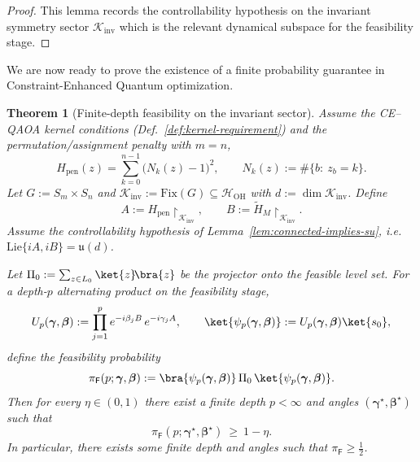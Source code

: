\documentclass[a4paper,unpublished,onecolumn,11pt]{quantumarticle}
\newtheorem{theorem}{Theorem}
\theoremstyle{definition}
\theoremstyle{remark}
\newcommand{\OH}{\mathcal{H}_{\mathrm{OH}}}
\begin{document}
\begin{proof}
This lemma records the controllability hypothesis on the invariant symmetry sector
$\mathcal K_{\mathrm{inv}}$ which is the relevant dynamical subspace for the feasibility stage.
\end{proof}

\medskip
We are now ready to prove the existence of a finite probability guarantee in Constraint-Enhanced Quantum optimization.

\begin{theorem}[Finite-depth feasibility on the invariant sector]
\label{thm:finite-depth-feasible}
Assume the CE--QAOA kernel conditions (Def.~\ref{def:kernel-requirement}) and the
permutation/assignment penalty with $m=n$,
\[
H_{\mathrm{pen}}(z)=\sum_{k=0}^{n-1}\bigl(N_k(z)-1\bigr)^2,
\qquad N_k(z):=\#\{b:\ z_b=k\}.
\]
Let $G:=S_m\times S_n$ and $\mathcal K_{\mathrm{inv}}:=\mathrm{Fix}(G)\subseteq\OH$ with $d:=\dim\mathcal K_{\mathrm{inv}}$.
Define
\[
A:=H_{\mathrm{pen}}\!\upharpoonright_{\mathcal K_{\mathrm{inv}}},
\qquad
B:=\widetilde H_M\!\upharpoonright_{\mathcal K_{\mathrm{inv}}}.
\]
Assume the controllability hypothesis of Lemma~\ref{lem:connected-implies-su}, i.e.\
$\mathrm{Lie}\{iA,iB\}=\mathfrak u(d)$.

Let $\Pi_0:=\sum_{z\in L_0}\ket{z}\!\bra{z}$ be the projector onto the feasible level set.
For a depth-$p$ alternating product on the feasibility stage,
\[
U_p(\boldsymbol\gamma,\boldsymbol\beta)
:=\prod_{j=1}^{p} e^{-i\beta_j B}\,e^{-i\gamma_j A},
\qquad
\ket{\psi_p(\boldsymbol\gamma,\boldsymbol\beta)}:=U_p(\boldsymbol\gamma,\boldsymbol\beta)\ket{s_0},
\]
define the feasibility probability
\[
\pi_{\mathsf F}(p;\boldsymbol\gamma,\boldsymbol\beta)
:=\bra{\psi_p(\boldsymbol\gamma,\boldsymbol\beta)}\,\Pi_0\,\ket{\psi_p(\boldsymbol\gamma,\boldsymbol\beta)}.
\]
Then for every $\eta\in(0,1)$ there exist a finite depth $p<\infty$ and angles
$(\boldsymbol\gamma^\star,\boldsymbol\beta^\star)$ such that
\[
\pi_{\mathsf F}(p;\boldsymbol\gamma^\star,\boldsymbol\beta^\star)\ \ge\ 1-\eta.
\]
In particular, there exists some finite depth and angles such that $\pi_{\mathsf F}\ge \tfrac12$.
\end{theorem}
\end{document}
